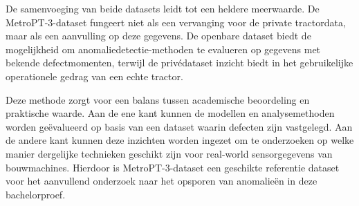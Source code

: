 De samenvoeging van beide datasets leidt tot een heldere meerwaarde. De MetroPT-3-dataset fungeert niet als een vervanging voor de private tractordata, maar als een aanvulling op deze gegevens. De openbare dataset biedt de mogelijkheid om anomaliedetectie-methoden te evalueren op gegevens met bekende defectmomenten, terwijl de privédataset inzicht biedt in het gebruikelijke operationele gedrag van een echte tractor.

Deze methode zorgt voor een balans tussen academische beoordeling en praktische waarde. Aan de ene kant kunnen de modellen en analysemethoden worden geëvalueerd op basis van een dataset waarin defecten zijn vastgelegd. Aan de andere kant kunnen deze inzichten worden ingezet om te onderzoeken op welke manier dergelijke technieken geschikt zijn voor real-world sensorgegevens van bouwmachines. Hierdoor is MetroPT-3-dataset een geschikte referentie dataset voor het aanvullend onderzoek naar het opsporen van anomalieën in deze bachelorproef.




